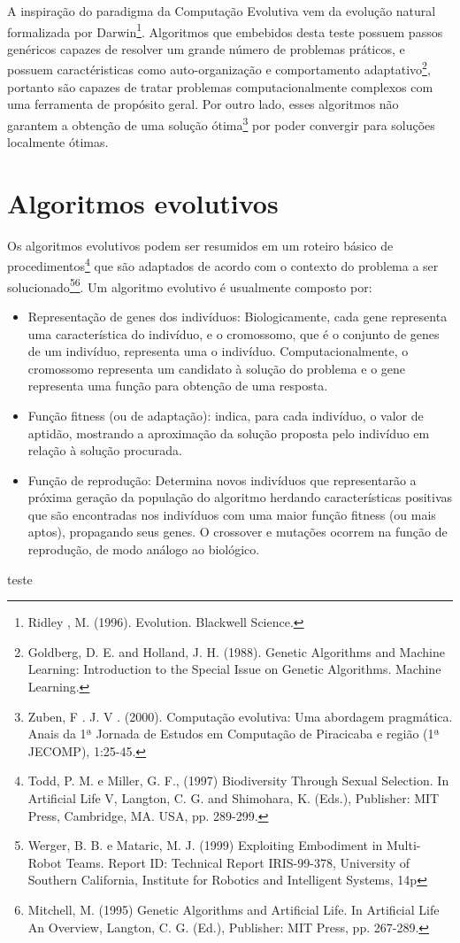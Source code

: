 A inspiração do paradigma da Computação Evolutiva vem da evolução natural formalizada por Darwin\footnote
{Ridley , M. (1996). Evolution. Blackwell Science.}.
Algoritmos que embebidos desta teste possuem passos genéricos capazes de resolver um grande número de problemas práticos, e possuem caractéristicas como auto-organização e comportamento adaptativo\footnote
{Goldberg, D. E. and Holland, J. H. (1988). Genetic Algorithms and Machine Learning: Introduction to the Special Issue on Genetic Algorithms. Machine Learning.},
portanto são capazes de tratar problemas computacionalmente complexos com uma ferramenta de propósito geral. Por outro lado, esses algoritmos não garantem a obtenção de uma solução ótima\footnote
{Zuben, F . J. V . (2000). Computação evolutiva: Uma abordagem pragmática. Anais da 1ª Jornada de Estudos em Computação de Piracicaba e região (1ª JECOMP), 1:25-45.}
por poder convergir para soluções localmente ótimas.

\section{Algoritmos evolutivos}
Os algoritmos evolutivos podem ser resumidos em um roteiro básico de procedimentos\footnote
{Todd, P. M. e Miller, G. F., (1997) Biodiversity Through Sexual Selection. In Artificial Life V, Langton, C. G. and Shimohara, K. (Eds.), Publisher: MIT Press, Cambridge, MA. USA, pp. 289-299.}
que são adaptados de acordo com o contexto do problema a ser solucionado\footnote
{Werger, B. B. e Mataric, M. J. (1999) Exploiting Embodiment in Multi-Robot Teams. Report ID: Technical Report IRIS-99-378, University of Southern California, Institute for Robotics and Intelligent Systems, 14p}\footnote
{Mitchell, M. (1995) Genetic Algorithms and Artificial Life. In Artificial Life An Overview, Langton, C. G. (Ed.), Publisher: MIT Press, pp. 267-289.}.
Um algoritmo evolutivo é usualmente composto por:

\begin{itemize}
    \item Representação de genes dos indivíduos: Biologicamente, cada gene representa uma característica do indivíduo, e o cromossomo, que é o conjunto de genes de um indivíduo, representa uma o indivíduo. Computacionalmente, o cromossomo representa um candidato à solução do problema e o gene representa uma função para obtenção de uma resposta.
    \item Função fitness (ou de adaptação): indica, para cada indivíduo, o valor de aptidão, mostrando a aproximação da solução proposta pelo indivíduo em relação à solução procurada.
    \item Função de reprodução: Determina novos indivíduos que representarão a próxima geração da população do algoritmo herdando características positivas que são encontradas nos indivíduos com uma maior função fitness (ou mais aptos), propagando seus genes. O crossover e mutações ocorrem na função de reprodução, de modo análogo ao biológico.
\end{itemize}

teste